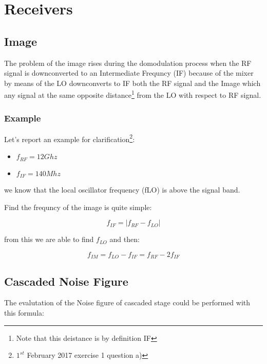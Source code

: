


\chapter{Receivers} %
\label{cha:receivers}


\section{Image} %
\label{sec:image}

The problem of the image rises during the domodulation process when the RF signal is downconverted to an Intermediate Frequncy (IF) because of the mixer by means of the LO downconverts to IF both the RF signal and the Image which any signal at the same opposite distance\footnote{Note that this deistance is by definition IF} from the LO with respect to RF signal.

\subsection*{Example} %
\label{sub:example}

Let's report an example for clarification\footnote{$1^{st}$ February 2017 exercise 1 question a)}:
\begin{itemize}
	\item $f_{RF}= 12 Ghz$ 
	\item $f_{IF}= 140 Mhz$ 
\end{itemize}

we know that the local oscillator frequency (fLO) is above the signal band.

Find the frequncy of the image is quite simple:


\begin{equation}
	f_{IF}=|f_{RF}-f_{LO}|
\end{equation}

from this we are able to find $f_{LO}$ and then:

\begin{equation}
		f_{IM}=f_{LO}-f_{IF}= f_{RF}-2f_{IF}
\end{equation}


\section{Cascaded Noise Figure} %
\label{sec:cascaded_noise_figure}

The evalutation of the Noise figure of cascaded stage could be performed with this formula:

